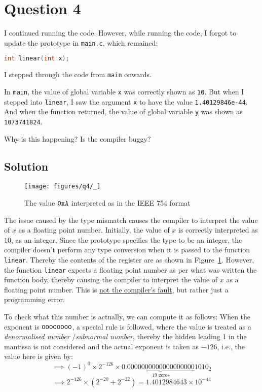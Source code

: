 \section*{Question 4}

I continued running the code.
However, while running the code, I forgot to update the prototype in \texttt{main.c}, which remained:
\begin{lstlisting}[language=C]
int linear(int x);
\end{lstlisting}

I stepped through the code from \texttt{main} onwards.

In \texttt{main}, the value of global variable \texttt{x} was correctly shown as \texttt{10}.
But when I stepped into \texttt{linear}, I saw the argument \texttt{x} to have the value \texttt{1.40129846e-44}.
And when the function returned, the value of global variable \texttt{y} was shown as \texttt{1073741824}.

Why is this happening?
Is the compiler buggy?

\subsection*{Solution}

\begin{figure*}[htbp]
    \centering
    \texttt{[image: figures/q4/\_]}
    \setlength{\abovecaptionskip}{-12pt}
    \caption{
        The value \( \texttt{0xA} \) interpreted as in the IEEE 754 format
    }\label{fig:q4}
\end{figure*}

The issue caused by the type mismatch causes the compiler to interpret the value of \( x \) as a floating point number.
Initially, the value of \( x \) is correctly interpreted as \( 10 \), as an integer.
Since the prototype specifies the type to be an integer, the compiler doesn't perform any type conversion when it is passed to the function \texttt{linear}.
Thereby the contents of the register are as shown in Figure~\ref{fig:q4}.
However, the function \texttt{linear} expects a floating point number as per what was written the function body, thereby causing the compiler to interpret the value of \( x \) as a floating point number.
This is \underline{not the compiler's fault}, but rather just a programming error.

To check what this number is actually, we can compute it as follows:
When the exponent is \( \texttt{00000000} \), a special rule is followed, where the value is treated as a \textit{denormalised number} /\textit{subnormal number}, thereby the hidden leading 1 in the mantissa is not considered and the actual exponent is taken as \( -126 \), i.e., the value here is given by:
\[
    \implies
    {(-1)}^0 \times 2^{ -126 } \times 0.\underbrace{0000000000000000000}_{19\text{ zeros}}1010_{2}
\]
\begin{equation*}
    \implies
    2^{ - 126 } \times (2^{-20} + 2^{-22})
    =
    1.4012984643 \times 10^{-44}
\end{equation*}

